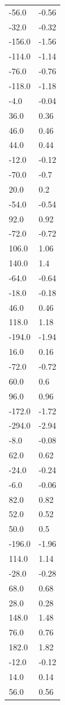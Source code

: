 \begin{longtable}{ll}
-56.0 & -0.56 \\
-32.0 & -0.32 \\
-156.0 & -1.56 \\
-114.0 & -1.14 \\
-76.0 & -0.76 \\
-118.0 & -1.18 \\
-4.0 & -0.04 \\
36.0 & 0.36 \\
46.0 & 0.46 \\
44.0 & 0.44 \\
-12.0 & -0.12 \\
-70.0 & -0.7 \\
20.0 & 0.2 \\
-54.0 & -0.54 \\
92.0 & 0.92 \\
-72.0 & -0.72 \\
106.0 & 1.06 \\
140.0 & 1.4 \\
-64.0 & -0.64 \\
-18.0 & -0.18 \\
46.0 & 0.46 \\
118.0 & 1.18 \\
-194.0 & -1.94 \\
16.0 & 0.16 \\
-72.0 & -0.72 \\
60.0 & 0.6 \\
96.0 & 0.96 \\
-172.0 & -1.72 \\
-294.0 & -2.94 \\
-8.0 & -0.08 \\
62.0 & 0.62 \\
-24.0 & -0.24 \\
-6.0 & -0.06 \\
82.0 & 0.82 \\
52.0 & 0.52 \\
50.0 & 0.5 \\
-196.0 & -1.96 \\
114.0 & 1.14 \\
-28.0 & -0.28 \\
68.0 & 0.68 \\
28.0 & 0.28 \\
148.0 & 1.48 \\
76.0 & 0.76 \\
182.0 & 1.82 \\
-12.0 & -0.12 \\
14.0 & 0.14 \\
56.0 & 0.56 \\

\end{longtable}
